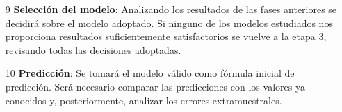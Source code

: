 \begin{itemize}
\item[9] \textbf{Selecci\'on del modelo}: Analizando los resultados de las fases anteriores se decidir\'a sobre el modelo adoptado. Si ninguno de los modelos estudiados nos proporciona resultados suficientemente satisfactorios se vuelve a la etapa 3, revisando todas las decisiones adoptadas.
\item[10] \textbf{Predicci\'on}: Se tomar\'a el modelo v\'alido como f\'ormula inicial de predicci\'on. Ser\'a necesario comparar las predicciones con los valores ya conocidos y, posteriormente, analizar los errores extramuestrales.
\end{itemize}
%
%


%


